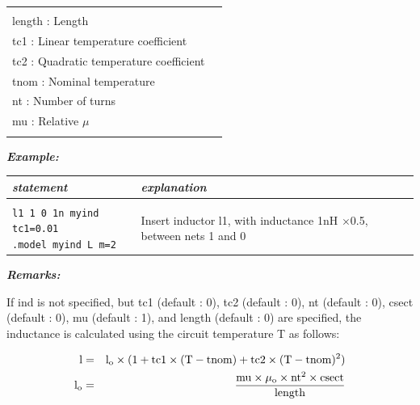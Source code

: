 {\begin{longtable}{l l}
\begin{tabular}{lp{5.5cm}p{5cm}}
																					{\small csect : Cross section} \\ 
																					{\small length : Length} \\
																					{\small tc1 : Linear temperature coefficient} \\
																					{\small tc2 : Quadratic temperature coefficient} \\
																					{\small tnom :  Nominal temperature} \\
																					{\small nt : Number of turns} \\
																					{\small mu : Relative $\mu$} \\																					  
																					\end{tabular}																					
\end{longtable}

\textbf{\textit{Example:}}

\begin{longtable}{l l}
\textit{statement} & \textit{explanation} \\ \hline \\ %
			\parbox{15em}{\texttt{l1 1 0 1n myind tc1=0.01}\\ 
			\texttt{.model myind L m=2}}
			& \parbox{25em}{{\small Insert inductor l1, with inductance 1nH $\times$0.5, between\\nets 1 and 0}} 
\end{longtable}


\textbf{\textit{Remarks:}}

If ind is not specified, but tc1 (default : 0), tc2 (default : 0), nt (default : 0), csect (default : 0), mu (default : 1), and length (default : 0) are specified, the inductance is calculated using the circuit temperature T as follows:

\begin{eqnarray}
\rm{l} &=& \rm{l}_o\times(1+\rm{tc1}\times(\rm{T}-\rm{tnom})+\rm{tc2}\times(\rm{T}-\rm{tnom})^2) \nonumber\\
\rm{l}_o &=& \frac{\rm{mu}\times\mu_o\times\rm{nt}^2\times\rm{csect}}{\rm{length}}\nonumber
\end{eqnarray} 


}

